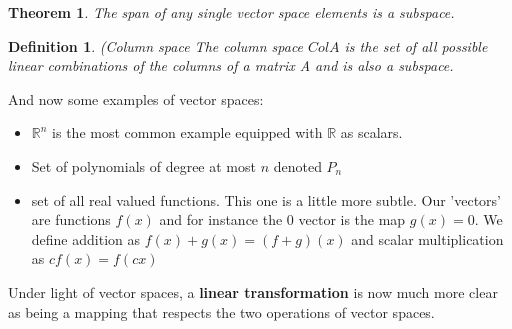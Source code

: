 \documentclass{article}
\newtheorem{thm}{Theorem}[subsection]
\newtheorem{definition}{Definition}[subsection]
\numberwithin{equation}{subsection}
\begin{document}
\begin{thm}
The span of any single vector space elements is a subspace. 
\end{thm}

\begin{definition}(Column space
The column space $Col A$ is the set of all possible linear combinations of the columns of a matrix A and is also a subspace.
\end{definition}


And now some examples of vector spaces:

\begin{example}
\begin{itemize}
    \item $\mathbb{R}^{n}$ is the most common example equipped with $\mathbb{R}$ as scalars.
    \item Set of polynomials of degree at most $n$ denoted $P_{n}$
    \item set of all real valued functions. This one is a little more subtle. Our 'vectors' are functions $f(x)$ and for instance the 0 vector is the map $g(x) = 0$. We define addition as $f(x) + g(x) = (f+g)(x)$ and scalar multiplication as $cf(x) = f(cx)$
\end{itemize}
\end{example}

Under light of vector spaces, a \textbf{linear transformation} is now much more clear as being a mapping that respects the two operations of vector spaces. 
\end{document}
